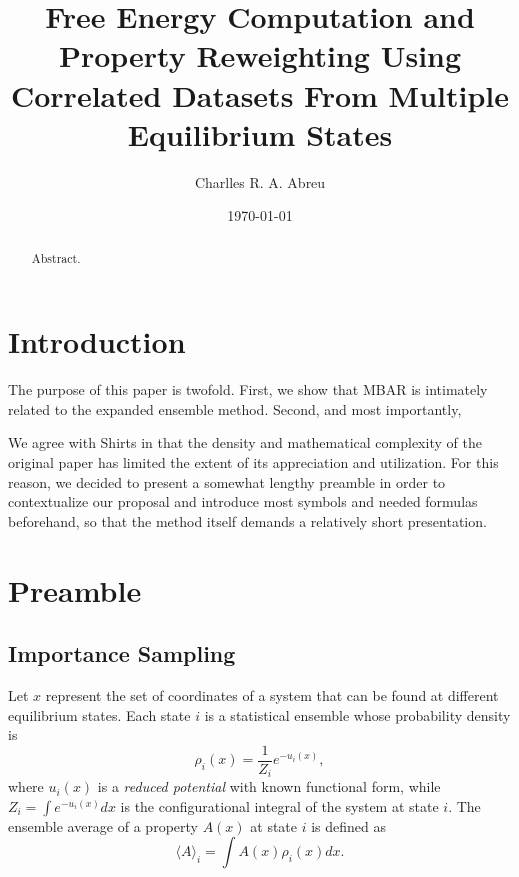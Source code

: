 \documentclass[aip,jcp,reprint,amsmath,amssymb]{revtex4-1}
\begin{document}
\title{Free Energy Computation and Property Reweighting Using Correlated Datasets From Multiple Equilibrium States}

\author{Charlles R. A. Abreu}

\date{\today}

\begin{abstract}
Abstract.
\end{abstract}

\maketitle

\section{Introduction}
\label{sec:introduction}

The purpose of this paper is twofold. First, we show that MBAR is intimately related to the expanded ensemble method. Second, and most importantly, 

We agree with Shirts\cite{Shirts_2017} in that the density and mathematical complexity of the original  paper has limited the extent of its appreciation and utilization. For this reason, we decided to present a somewhat lengthy preamble in order to contextualize our proposal and introduce most symbols and needed formulas beforehand, so that the method itself demands a relatively short presentation.

\section{Preamble}

\subsection{Importance Sampling}
\label{sec:definitions}

Let $x$ represent the set of coordinates of a system that can be found at different equilibrium states. Each state $i$ is a statistical ensemble whose probability density is
\begin{equation}
\label{eq:state_prob_density}
\rho_i(x) = \frac{1}{Z_i} e^{-u_i(x)},
\end{equation}
where $u_i(x)$ is a \textit{reduced potential}\cite{Shirts_2008, Chodera_2011} with known functional form, while $Z_i = \int e^{-u_i(x)}dx$ is the configurational integral of the system at state $i$. The ensemble average of a property $A(x)$ at state $i$ is defined as
\begin{equation}
\label{eq:ensemble average}
\langle A \rangle_i = \int A(x)\rho_i(x)dx.
\end{equation}
\end{document}
